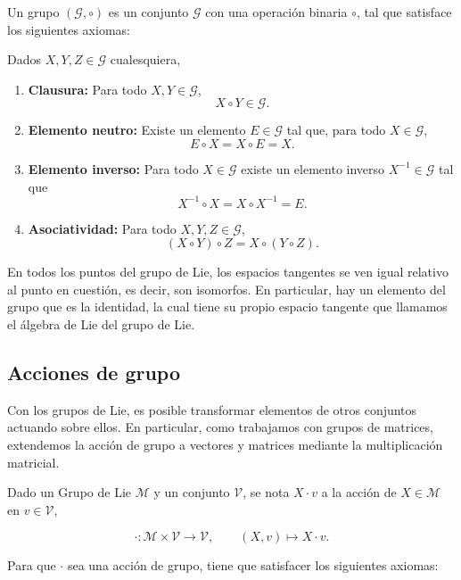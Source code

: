 Un grupo $(\mathcal{G}, \circ)$ es un conjunto $\mathcal{G}$ con una operación binaria $\circ$, tal que satisface los siguientes axiomas:

Dados $X, Y, Z \in \mathcal{G}$ cualesquiera,

\begin{enumerate}
\item \textbf{Clausura:} 
Para todo $X, Y \in \mathcal{G}$,
\[
X \circ Y \in \mathcal{G}.
\]

\item \textbf{Elemento neutro:} 
Existe un elemento $E \in \mathcal{G}$ tal que, para todo $X \in \mathcal{G}$,
\[
E \circ X = X \circ E = X.
\]

\item \textbf{Elemento inverso:} 
Para todo $X \in \mathcal{G}$ existe un elemento inverso $X^{-1} \in \mathcal{G}$ tal que
\[
X^{-1} \circ X
=
X \circ X^{-1}
=
E.
\]

\item \textbf{Asociatividad:} 
Para todo $X, Y, Z \in \mathcal{G}$,
\[
(X \circ Y) \circ Z
=
X \circ (Y \circ Z).
\]
\end{enumerate}

En todos los puntos del grupo de Lie, los espacios tangentes se ven igual relativo al punto en cuestión, es decir, son isomorfos. En particular, hay un elemento del grupo que es la identidad, la cual tiene su propio espacio tangente que llamamos el álgebra de Lie del grupo de Lie.



\subsection{Acciones de grupo}

Con los grupos de Lie, es posible transformar elementos de otros conjuntos actuando sobre ellos. En particular, como trabajamos con grupos de matrices, extendemos la acción de grupo a vectores y matrices mediante la multiplicación matricial.

Dado un Grupo de Lie $\mathcal{M}$ y un conjunto $\mathcal{V}$, se nota $X \cdot v$ a la acción de $X \in \mathcal{M}$ en $v \in \mathcal{V}$,

$$
\cdot : \mathcal{M} \times \mathcal{V} \to \mathcal{V}, 
\qquad
(X, v) \mapsto X \cdot v.
$$

Para que $\cdot$ sea una acción de grupo, tiene que satisfacer los siguientes axiomas:

